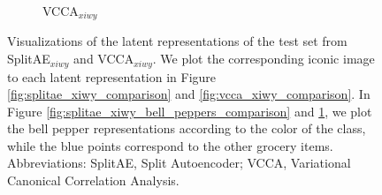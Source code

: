 \begin{figure}[t]
\begin{subfigure}[b]{0.40\textwidth}
         \caption{VCCA$_{xiwy}$}
         \label{fig:vcca_xiwy_bell_peppers_comparison}
     \end{subfigure}
     \caption{Visualizations of the latent representations of the test set from SplitAE$_{xiwy}$ and VCCA$_{xiwy}$. We plot the corresponding iconic image to each latent representation in Figure \ref{fig:splitae_xiwy_comparison} and \ref{fig:vcca_xiwy_comparison}. In Figure \ref{fig:splitae_xiwy_bell_peppers_comparison} and \ref{fig:vcca_xiwy_bell_peppers_comparison}, we plot the bell pepper representations according to the color of the class, while the blue points correspond to the other grocery items. Abbreviations: SplitAE, Split Autoencoder; VCCA, Variational Canonical Correlation Analysis.}
     \label{fig:2d_visualizations_pca_splitae_vcca_comparison}
     \vspace{-3mm}  
\end{figure}
